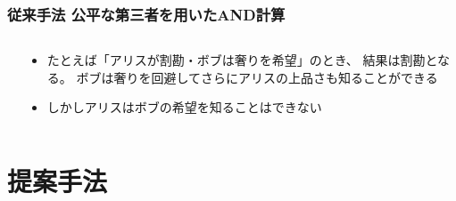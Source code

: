\begin{frame}
  \frametitle{従来手法 公平な第三者を用いたAND計算}

  \begin{columns}
    \begin{column}{0.6\textwidth}

      \pause
    \end{column}
    \begin{column}{0.4\textwidth}
      \begin{itemize}
        \item たとえば「アリスが割勘・ボブは奢りを希望」のとき、
        結果は割勘となる。
        ボブは奢りを回避してさらにアリスの上品さも知ることができる

        \item しかしアリスはボブの希望を知ることはできない
      \end{itemize}
    \end{column}
  \end{columns}
\end{frame}

\section{提案手法}

